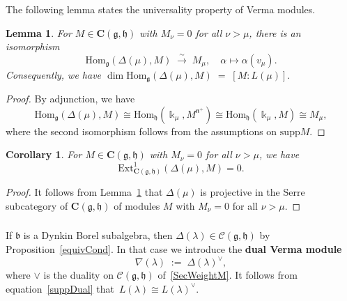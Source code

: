 \documentclass[11pt]{amsart}
\newcommand{\supp}{\mathrm{supp}}
\newcommand{\bC}{\mathbf{C}}
\newcommand{\Hom}{\mathrm{Hom}}
\newcommand{\Ext}{\mathrm{Ext}}
\newcommand{\mk}{\Bbbk}
\newcommand{\cC}{\mathcal{C}}
\newcommand{\fn}{\mathfrak{n}}
\newcommand{\fg}{\mathfrak{g}}
\newcommand{\fl}{\mathfrak{l}}
\newcommand{\fh}{\mathfrak{h}}
\newcommand{\fb}{\mathfrak{b}}
\numberwithin{equation}{section}
\theoremstyle{plain}
\newtheorem{lemma}[subsubsection]{Lemma}
\newtheorem{cor}[subsubsection]{Corollary}
\theoremstyle{remark}
\theoremstyle{remark}
\theoremstyle{construction}
\newcommand{\res}{{\rm Res}}
\begin{document}
The following lemma states the universality property of Verma modules.
\begin{lemma}\label{LemDeltaProj}
For $M\in \bC(\fg,\fh)$ with $M_\nu=0$ for all $\nu> \mu$, {there is} an isomorphism
$$\Hom_{\fg}(\Delta(\mu),M)\;\stackrel{\sim}{\to} \; M_\mu,\quad \alpha\mapsto \alpha(v_\mu).$$
Consequently, we have
$\dim \Hom_{\fg}(\Delta(\mu),M)\;=\; [M:L(\mu)].$
\end{lemma}
\begin{proof}
By adjunction, we have
$$\Hom_{\fg}(\Delta(\mu),M)\cong \Hom_{\fh}(\mk_\mu, M^{\fn^+})\cong \Hom_{\fh}(\mk_\mu, M)\cong M_\mu,$$
where the second isomorphism follows from the assumptions on $\supp M $.
\end{proof} %


\begin{cor}\label{CorExt1}
For $M\in \bC(\fg,\fh)$ with $M_\nu=0$ for all $\nu> \mu$, we have
$$\Ext^1_{\bC(\fg,\fh)}(\Delta(\mu),M)=0.$$
\end{cor}
\begin{proof}
It follows from Lemma~\ref{LemDeltaProj} that $\Delta(\mu)$ is projective in the Serre subcategory of $\bC(\fg,\fh)$ of modules $M$ with $M_\nu=0$ for all $\nu> \mu$.
\end{proof}


\subsubsection{} If $\fb$ is a Dynkin Borel subalgebra, then $\Delta(\lambda)\in \cC(\fg,\fh)$ by Proposition~\ref{equivCond}. In that case we introduce the {\bf dual Verma module}
$$\nabla(\lambda)\;:=\;\Delta(\lambda)^{\vee},$$ where $\vee$ is the duality on $\cC(\fg,\fh)$ of~\ref{SecWeightM}.
It follows from equation~\eqref{suppDual} that~$L(\lambda)\cong L(\lambda)^\vee$.
\end{document}
